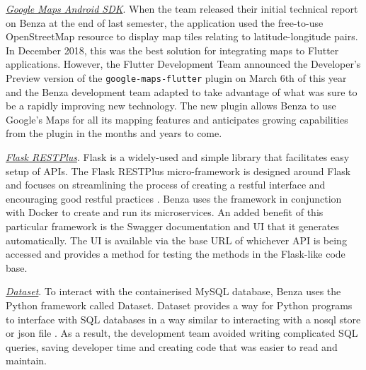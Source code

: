 \documentclass{article}
\begin{document}
    \emph{\href{https://developers.google.com/maps/documentation/android-sdk/intro}{Google Maps Android SDK}}. When the team released their initial technical report on Benza at the end of last semester, the application used the free-to-use OpenStreetMap resource to display map tiles relating to latitude-longitude pairs. In December 2018, this was the best solution for integrating maps to Flutter applications. However, the Flutter Development Team announced the Developer's Preview version \cite{fluttergooglemapspluginrelease} of the \texttt{google-maps-flutter} plugin on March 6th of this year and the Benza development team adapted to take advantage of what was sure to be a rapidly improving new technology. The new plugin allows Benza to use Google's Maps for all its mapping features and anticipates growing capabilities from the plugin in the months and years to come. \par
    
    \emph{\href{https://flask-restplus.readthedocs.io/en/stable/example.html}{Flask RESTPlus}}. Flask is a widely-used and simple library that facilitates easy setup of APIs. The Flask RESTPlus micro-framework is designed around Flask and focuses on streamlining the process of creating a \gls{restful} interface and encouraging good \gls{restful} practices \cite{flaskrestplushome}. Benza uses the framework in conjunction with Docker to create and run its microservices. An added benefit of this particular framework is the Swagger documentation and UI that it generates automatically. The UI is available via the base URL of whichever API is being accessed and provides a method for testing the methods in the Flask-like code base. \par
    
    \emph{\href{https://dataset.readthedocs.io/en/latest/}{Dataset}}. To interact with the containerised MySQL database, Benza uses the Python framework called Dataset. Dataset provides a way for Python programs to interface with SQL databases in a way similar to interacting with a \acrshort{nosql} store or \acrshort{json} file \cite{datasetquickstartdocs}. As a result, the development team avoided writing complicated SQL queries, saving developer time and creating code that was easier to read and maintain. \par
    
\end{document}
